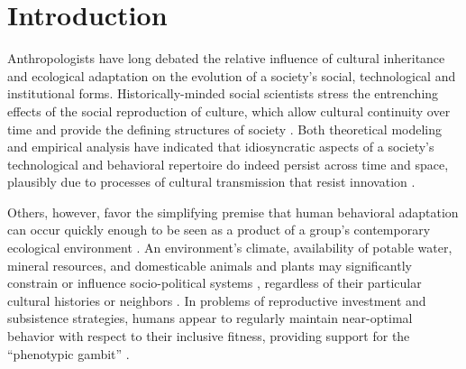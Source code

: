 


	
\section{Introduction}

Anthropologists have long debated the relative influence of cultural inheritance and ecological adaptation on the evolution of a society's social, technological and institutional forms.  Historically-minded social scientists stress the entrenching effects of the social reproduction of culture, which allow cultural continuity over time and provide the defining structures of society \citep{Gaddis2002, Wimsatt2007}.  Both theoretical modeling and empirical analysis have indicated that idiosyncratic aspects of a society's technological and behavioral repertoire do indeed persist across time and space, plausibly due to processes of cultural transmission that resist innovation \citep{Edgerton1971,Guglielmino1995, Nisbett1996, Richerson2005:NBGA, EerkensBettingerMcElreath2006, Temkin2007:CulturePhylogenetics}.  

Others, however, favor the simplifying premise that human behavioral adaptation can occur quickly enough to be seen as a product of a group's contemporary ecological environment \citep{Steward1955, Diamond2002domestication}.  An environment's climate, availability of potable water, mineral resources, and domesticable animals and plants may significantly constrain or influence socio-political systems \citep{JohnsonEarle2000:EvolSocieties, Kirch2007}, regardless of their particular cultural histories or neighbors \citep{Rogers&Cashdan1997:phylogeny, Cashdan&Rogers1997:review}.  In problems of reproductive investment and subsistence strategies, humans appear to regularly maintain near-optimal behavior with respect to their inclusive fitness, providing support for the ``phenotypic gambit'' \citep{WinterhalderSmith2000}.  

